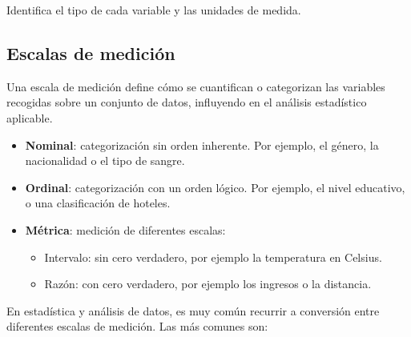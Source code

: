 \documentclass[
  letterpaper,
  DIV=11,
  numbers=noendperiod]{scrreprt}
\begin{document}
\begin{tcolorbox}[enhanced jigsaw, arc=.35mm, breakable, coltitle=black, left=2mm, opacityback=0, bottomtitle=1mm, colbacktitle=quarto-callout-caution-color!10!white, title=\textcolor{quarto-callout-caution-color}{\faFire}\hspace{0.5em}{Ejercicio}, titlerule=0mm, colback=white, colframe=quarto-callout-caution-color-frame, bottomrule=.15mm, rightrule=.15mm, opacitybacktitle=0.6, toptitle=1mm, toprule=.15mm, leftrule=.75mm]

Identifica el tipo de cada variable y las unidades de medida.

\end{tcolorbox}

\hypertarget{escalas-de-mediciuxf3n}{%
\subsection{Escalas de medición}\label{escalas-de-mediciuxf3n}}

Una escala de medición define cómo se cuantifican o categorizan las
variables recogidas sobre un conjunto de datos, influyendo en el
análisis estadístico aplicable.

\begin{itemize}
\item
  \textbf{Nominal}: categorización sin orden inherente. Por ejemplo, el
  género, la nacionalidad o el tipo de sangre.
\item
  \textbf{Ordinal}: categorización con un orden lógico. Por ejemplo, el
  nivel educativo, o una clasificación de hoteles.
\item
  \textbf{Métrica}: medición de diferentes escalas:

  \begin{itemize}
  \item
    Intervalo: sin cero verdadero, por ejemplo la temperatura en
    Celsius.
  \item
    Razón: con cero verdadero, por ejemplo los ingresos o la distancia.
  \end{itemize}
\end{itemize}

En estadística y análisis de datos, es muy común recurrir a conversión
entre diferentes escalas de medición. Las más comunes son:
\end{document}

